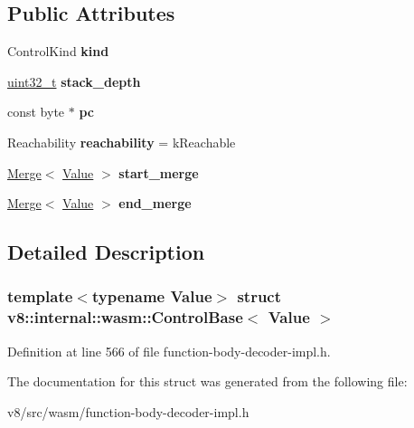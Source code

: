 \subsection*{Public Attributes}
\begin{DoxyCompactItemize}
\item 
\mbox{\label{structv8_1_1internal_1_1wasm_1_1ControlBase_af134cc64e22140e1260f67653ac3c413}} 
Control\+Kind {\bfseries kind}
\item 
\mbox{\label{structv8_1_1internal_1_1wasm_1_1ControlBase_a68c0eb80752edc1b52ffbe403218b63e}} 
\mbox{\hyperlink{classuint32__t}{uint32\+\_\+t}} {\bfseries stack\+\_\+depth}
\item 
\mbox{\label{structv8_1_1internal_1_1wasm_1_1ControlBase_aa3e58679234e3cc11ed2ee6f04357c00}} 
const byte $\ast$ {\bfseries pc}
\item 
\mbox{\label{structv8_1_1internal_1_1wasm_1_1ControlBase_aa4cb10d2848958371a9d9ac8d86a1869}} 
Reachability {\bfseries reachability} = k\+Reachable
\item 
\mbox{\label{structv8_1_1internal_1_1wasm_1_1ControlBase_ad1a0aa24da67eb4190f0bc6b249d4d25}} 
\mbox{\hyperlink{structv8_1_1internal_1_1wasm_1_1Merge}{Merge}}$<$ \mbox{\hyperlink{classv8_1_1Value}{Value}} $>$ {\bfseries start\+\_\+merge}
\item 
\mbox{\label{structv8_1_1internal_1_1wasm_1_1ControlBase_aff6d37c35961d6e88b984f1b75a55abf}} 
\mbox{\hyperlink{structv8_1_1internal_1_1wasm_1_1Merge}{Merge}}$<$ \mbox{\hyperlink{classv8_1_1Value}{Value}} $>$ {\bfseries end\+\_\+merge}
\end{DoxyCompactItemize}


\subsection{Detailed Description}
\subsubsection*{template$<$typename Value$>$\newline
struct v8\+::internal\+::wasm\+::\+Control\+Base$<$ Value $>$}



Definition at line 566 of file function-\/body-\/decoder-\/impl.\+h.



The documentation for this struct was generated from the following file\+:\begin{DoxyCompactItemize}
\item 
v8/src/wasm/function-\/body-\/decoder-\/impl.\+h\end{DoxyCompactItemize}
